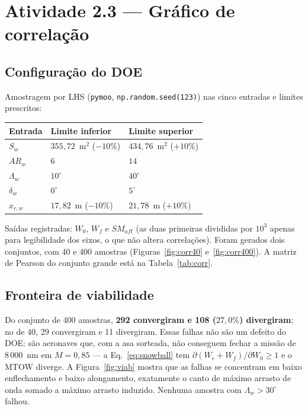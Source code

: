 \documentclass[11pt,a4paper]{article}
\newcommand{\code}[1]{\texttt{\small #1}}
\begin{document}
\section{Atividade 2.3 --- Gr\'afico de correla\c{c}\~ao}

\subsection{Configura\c{c}\~ao do DOE}

Amostragem por LHS (\code{pymoo}, \code{np.random.seed(123)}) nas cinco
entradas e limites prescritos:

\begin{center}
\begin{tabular}{lll}
\toprule
Entrada & Limite inferior & Limite superior \\
\midrule
$S_w$        & $355{,}72$~m$^2$ ($-10\%$) & $434{,}76$~m$^2$ ($+10\%$) \\
$AR_w$       & $6$    & $14$ \\
$\Lambda_w$  & $10^\circ$ & $40^\circ$ \\
$\delta_w$   & $0^\circ$  & $5^\circ$ \\
$x_{r,w}$    & $17{,}82$~m ($-10\%$) & $21{,}78$~m ($+10\%$) \\
\bottomrule
\end{tabular}
\end{center}

Sa\'idas registradas: $W_0$, $W_f$ e $SM_{aft}$ (as duas primeiras divididas
por $10^3$ apenas para legibilidade dos eixos, o que n\~ao altera
correla\c{c}\~oes). Foram gerados dois conjuntos, com 40 e 400 amostras
(Figuras~\ref{fig:corr40} e~\ref{fig:corr400}). A matriz de Pearson do
conjunto grande est\'a na Tabela~\ref{tab:corr}.

\subsection{Fronteira de viabilidade}
\label{sec:viab}

Do conjunto de 400 amostras, \textbf{292 convergiram e 108 ($27{,}0\%$)
divergiram}; no de 40, 29 convergiram e 11 divergiram. Essas falhas n\~ao
s\~ao um defeito do DOE: s\~ao aeronaves que, com a asa sorteada, n\~ao
conseguem fechar a miss\~ao de $8\,000$~nm em $M = 0{,}85$ --- a
Eq.~\eqref{eq:snowball} tem $\partial(W_e+W_f)/\partial W_0 \ge 1$ e o MTOW
diverge. A Figura~\ref{fig:viab} mostra que as falhas se concentram em baixo
enflechamento e baixo alongamento, exatamente o canto de m\'aximo arrasto de
onda somado a m\'aximo arrasto induzido. Nenhuma amostra com
$\Lambda_w > 30^\circ$ falhou.
\end{document}
